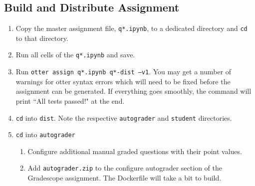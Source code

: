 \documentclass[12pt]{article}
\begin{document}
\subsection*{Build and Distribute Assignment}
\begin{enumerate}[font=\bfseries]
    \item Copy the master assignment file, \texttt{q*.ipynb}, to a dedicated directory and \texttt{cd} to that directory.
    \item Run all cells of the \texttt{q*.ipynb} and save.
    \item Run \texttt{otter assign q*.ipynb q*-dist --v1}. You may get a number of warnings for otter syntax errors which will need to be fixed before the assignment can be generated. If everything goes smoothly, the command will print ``All tests passed!" at the end.
    \item \texttt{cd} into \texttt{dist}. Note the respective \texttt{autograder} and \texttt{student} directories.
    \item \texttt{cd} into \texttt{autograder}
    \begin{enumerate}
        \item Configure additional manual graded questions with their point values.
        \item Add \texttt{autograder.zip} to the configure autograder section of the Gradescope assignment. The Dockerfile will take a bit to build.
    \end{enumerate}

\end{enumerate}
    
\end{document}
